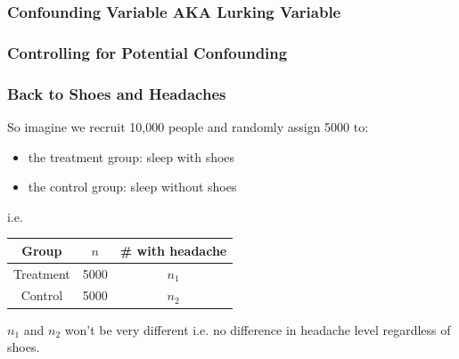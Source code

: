 \documentclass[handout]{beamer}
\newcommand{\blue}[1]{\textcolor{blue2}{#1}}
\begin{document}
\begin{frame}
\frametitle{Confounding Variable AKA Lurking Variable}

%
%
%

\end{frame}


\begin{frame}
\frametitle{Controlling for Potential Confounding}

%
%
%
%

\end{frame}


\begin{frame}
\frametitle{Back to Shoes and Headaches}

So imagine we recruit 10,000 people and \blue{randomly assign} 5000 to:

\begin{itemize}
\item the treatment group: sleep with shoes
\item the control group: sleep without shoes
\end{itemize}

\pause i.e.
\begin{center}
	\begin{tabular}{c|cc}
		Group & $n$ & \# with headache\\
		\hline	
		Treatment & 5000 & $n_1$\\
		Control & 5000 & $n_2$\\
  \end{tabular}
\end{center}
$n_1$ and $n_2$ won't be very different i.e. no difference in headache level regardless of shoes. 

\end{frame}
\end{document}
